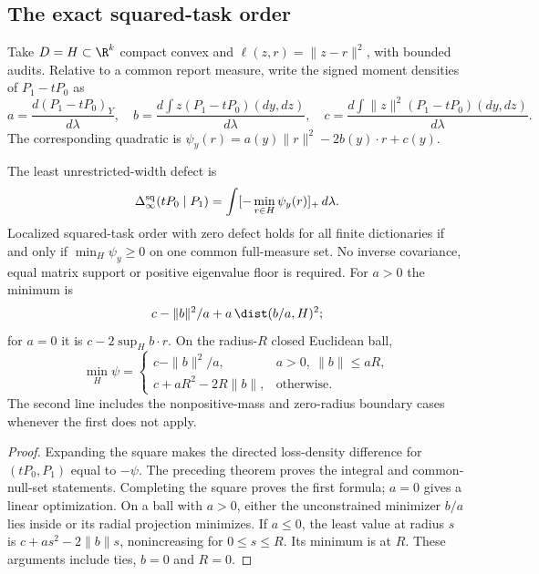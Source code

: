 \subsection{The exact squared-task order}
Take $D=H\subset\R^k$ compact convex and $\ell(z,r)=\|z-r\|^2$, with bounded audits. Relative to a common report measure, write the signed moment densities of $P_1-tP_0$ as
\[
 a=\frac{d(P_1-tP_0)_Y}{d\lambda},\quad
 b=\frac{d\int z(P_1-tP_0)(dy,dz)}{d\lambda},\quad
 c=\frac{d\int\|z\|^2(P_1-tP_0)(dy,dz)}{d\lambda}.
\]
The corresponding quadratic is $\psi_y(r)=a(y)\|r\|^2-2b(y)\cdot r+c(y)$.

\begin{theorem}\label{thm:quadratic-defect}
The least unrestricted-width defect is
\begin{equation}\label{eq:quadratic-defect}
 \Delta_\infty^{\rm sq}(tP_0\mid P_1)
     =\int[-\min_{r\in H}\psi_y(r)]_+\,d\lambda.
\end{equation}
Localized squared-task order with zero defect holds for all finite dictionaries if and only if $\min_H\psi_y\ge0$ on one common full-measure set. No inverse covariance, equal matrix support or positive eigenvalue floor is required. For $a>0$ the minimum is
\begin{equation}\label{eq:quadratic-projection}
 c-\|b\|^2/a+a\,\dist(b/a,H)^2;
\end{equation}
for $a=0$ it is $c-2\sup_H b\cdot r$. On the radius-$R$ closed Euclidean ball,
\begin{equation}\label{eq:quadratic-ball}
 \min_H\psi=\begin{cases}
 c-\|b\|^2/a,&a>0,\ \|b\|\le aR,\\
 c+aR^2-2R\|b\|,&\text{otherwise}.
 \end{cases}
\end{equation}
The second line includes the nonpositive-mass and zero-radius boundary cases whenever the first does not apply.
\end{theorem}
\begin{proof}
Expanding the square makes the directed loss-density difference for $(tP_0,P_1)$ equal to $-\psi$. The preceding theorem proves the integral and common-null-set statements. Completing the square proves the first formula; $a=0$ gives a linear optimization. On a ball with $a>0$, either the unconstrained minimizer $b/a$ lies inside or its radial projection minimizes. If $a\le0$, the least value at radius $s$ is $c+as^2-2\|b\|s$, nonincreasing for $0\le s\le R$. Its minimum is at $R$. These arguments include ties, $b=0$ and $R=0$.
\end{proof}

